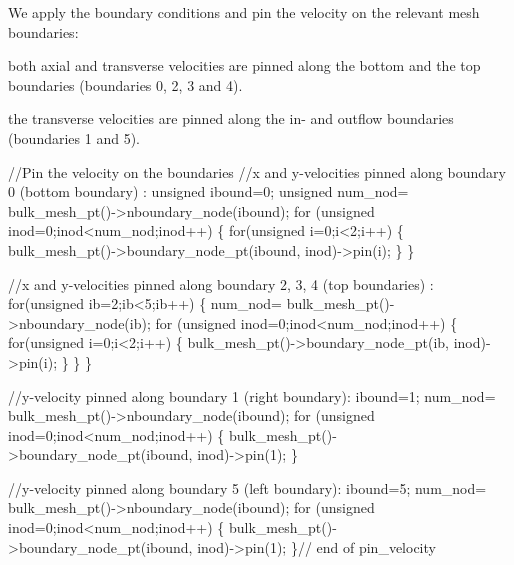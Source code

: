 We apply the boundary conditions and pin the velocity on the relevant mesh boundaries\+:
\begin{DoxyItemize}
\item both axial and transverse velocities are pinned along the bottom and the top boundaries (boundaries 0, 2, 3 and 4).
\item the transverse velocities are pinned along the in-\/ and outflow boundaries (boundaries 1 and 5).
\end{DoxyItemize}
\begin{DoxyCodeInclude}

  
  

 \textcolor{comment}{//Pin the velocity on the boundaries}
 \textcolor{comment}{//x and y-velocities pinned along boundary 0 (bottom boundary) :}
 \textcolor{keywordtype}{unsigned} ibound=0; 
 \textcolor{keywordtype}{unsigned} num\_nod= bulk\_mesh\_pt()->nboundary\_node(ibound);
 \textcolor{keywordflow}{for} (\textcolor{keywordtype}{unsigned} inod=0;inod<num\_nod;inod++)
  \{
   \textcolor{keywordflow}{for}(\textcolor{keywordtype}{unsigned} i=0;i<2;i++)
    \{
     bulk\_mesh\_pt()->boundary\_node\_pt(ibound, inod)->pin(i);
    \}
  \}
 
 
  \textcolor{comment}{//x and y-velocities pinned along boundary 2, 3, 4 (top boundaries) :}
 \textcolor{keywordflow}{for}(\textcolor{keywordtype}{unsigned} ib=2;ib<5;ib++)
  \{ 
   num\_nod= bulk\_mesh\_pt()->nboundary\_node(ib);
   \textcolor{keywordflow}{for} (\textcolor{keywordtype}{unsigned} inod=0;inod<num\_nod;inod++)
    \{
     \textcolor{keywordflow}{for}(\textcolor{keywordtype}{unsigned} i=0;i<2;i++)
      \{
       bulk\_mesh\_pt()->boundary\_node\_pt(ib, inod)->pin(i);
      \}
    \}
  \}

   \textcolor{comment}{//y-velocity pinned along boundary 1 (right boundary):}
  ibound=1; 
  num\_nod= bulk\_mesh\_pt()->nboundary\_node(ibound);
  \textcolor{keywordflow}{for} (\textcolor{keywordtype}{unsigned} inod=0;inod<num\_nod;inod++)
   \{
    bulk\_mesh\_pt()->boundary\_node\_pt(ibound, inod)->pin(1);
   \}


  \textcolor{comment}{//y-velocity pinned along boundary 5 (left boundary):}
  ibound=5; 
  num\_nod= bulk\_mesh\_pt()->nboundary\_node(ibound);
  \textcolor{keywordflow}{for} (\textcolor{keywordtype}{unsigned} inod=0;inod<num\_nod;inod++)
   \{
    bulk\_mesh\_pt()->boundary\_node\_pt(ibound, inod)->pin(1);
   \}\textcolor{comment}{// end of pin\_velocity}

\end{DoxyCodeInclude}


